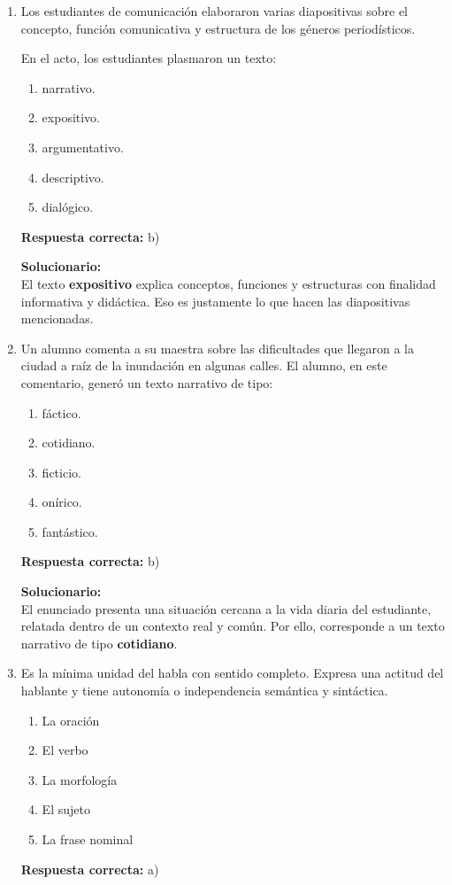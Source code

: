 \begin{enumerate}
	
	
	\item Los estudiantes de comunicación elaboraron varias diapositivas sobre el concepto, función comunicativa y estructura de los géneros periodísticos.
	
	En el acto, los estudiantes plasmaron un texto:
	\begin{enumerate}[label=\alph*)]
		\item narrativo.
		\item expositivo.
		\item argumentativo.
		\item descriptivo.
		\item dialógico.
	\end{enumerate}
	\textbf{Respuesta correcta:} b)
	
	\vspace{2mm}
	\textbf{Solucionario:}\\
	El texto \textbf{expositivo} explica conceptos, funciones y estructuras con finalidad informativa y didáctica.  
	Eso es justamente lo que hacen las diapositivas mencionadas.
	
	\vspace{6mm}
	
	\item Un alumno comenta a su maestra sobre las dificultades que llegaron a la ciudad a raíz de la inundación en algunas calles. El alumno, en este comentario, generó un texto narrativo de tipo:
	\begin{enumerate}[label=\alph*)]
		\item fáctico.
		\item cotidiano.
		\item ficticio.
		\item onírico.
		\item fantástico.
	\end{enumerate}
	\textbf{Respuesta correcta:} b)
	
	\vspace{2mm}
	\textbf{Solucionario:}\\
	El enunciado presenta una situación cercana a la vida diaria del estudiante, relatada dentro de un contexto real y común. Por ello, corresponde a un texto narrativo de tipo \textbf{cotidiano}.
	
	\vspace{6mm}
	
	
	\item Es la mínima unidad del habla con sentido completo. Expresa una actitud del hablante y tiene autonomía o independencia semántica y sintáctica.
	\begin{enumerate}[label=\alph*)]
		\item La oración
		\item El verbo
		\item La morfología
		\item El sujeto
		\item La frase nominal
	\end{enumerate}
	\textbf{Respuesta correcta:} a)
	

\end{enumerate}
